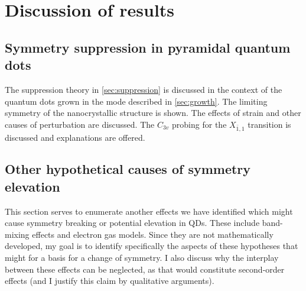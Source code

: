 \section{Discussion of results}

\subsection{Symmetry suppression in pyramidal quantum dots}
The suppression theory in \ref{sec:suppression} is discussed in the context of the quantum dots grown in the mode described in \ref{sec:growth}. The limiting symmetry of the nanocrystallic structure is shown. The effects of strain and other causes of perturbation are discussed. The $C_{3v}$ probing for the $X_{\bar{1},1}$ transition is discussed and explanations are offered.

\subsection{Other hypothetical causes of symmetry elevation}
This section serves to enumerate another effects we have identified which might cause symmetry breaking or potential elevation in QDs. These include band-mixing effects and electron gas models. Since they are not mathematically developed, my goal is to identify specifically the aspects of these hypotheses that might for a basis for a change of symmetry. I also discuss why the interplay between these effects can be neglected, as that would constitute second-order effects (and I justify this claim by qualitative arguments).

